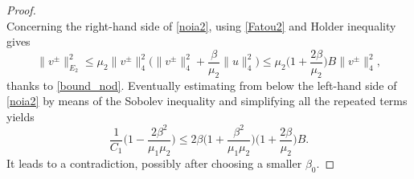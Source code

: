 \documentclass[10pt,a4paper]{amsart}
\numberwithin{equation}{section}
\begin{document}
\begin{proof}
\begin{equation}
\end{equation}
Concerning the right-hand side of \eqref{noia2}, using \eqref{Fatou2} and Holder
inequality gives
\[
 \|v^{\pm}\|_{E_2}^2
 \le \mu_2 \|v^{\pm}\|_4^2 \Big(\|v^{\pm}\|_{4}^2
+ \frac{\beta}{\mu_2} \| u\|_4^2 \Big)
 \le \mu_2 \Big(1+ \frac{2\beta}{\mu_2} \Big) B
 \|v^{\pm}\|_4^2 ,
\]
thanks to \eqref{bound_nod}.
Eventually estimating from below the left-hand side of \eqref{noia2} by means of
the Sobolev inequality and simplifying all the repeated terms yields
\begin{equation}\label{noia3}
\frac{1}{C_1} \Big(1-\frac{2\beta^2}{\mu_1\mu_2} \Big)
\le 2{\beta}\Big(1+\frac{\beta^2}{\mu_1\mu_2}\Big)\Big(1+ \frac{2\beta}{\mu_2} \Big) B.
\end{equation}
It leads to a contradiction, possibly after choosing a smaller $\beta_0$.


\end{proof}
\end{document}
